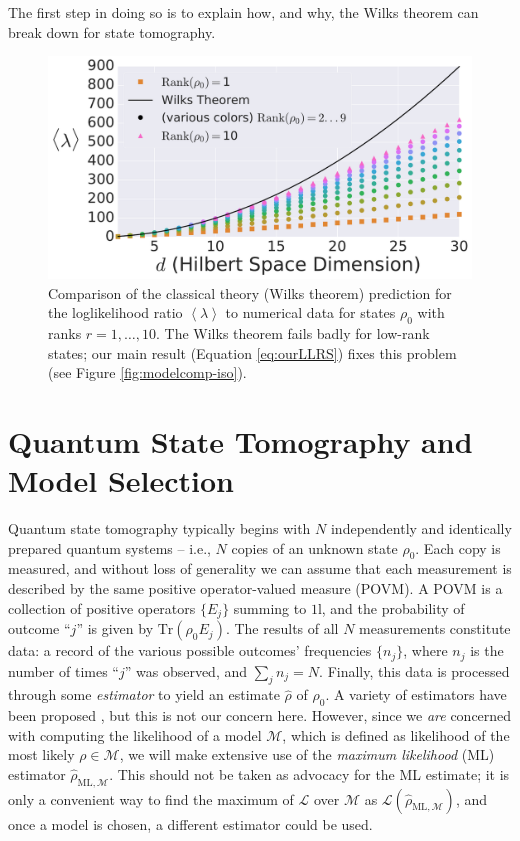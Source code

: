 \documentclass[aps,pra, twocolumn]{revtex4-1}
\newcommand{\M}{\mathcal{M}}
\newcommand{\Tr}{\mathrm{Tr}}
\newcommand{\cL}{\mathcal{L}}
\newcommand{\Id}{\mathbb{I}}
\newcommand{\expect}[1]{\ensuremath{\left\langle#1\right\rangle}}
\def\Id{1\!\mathrm{l}}
\newcommand{\rhohat}{\hat{\rho}}
\newcommand{\rhoML}[1]{\rhohat_{\scriptscriptstyle{\mathrm{ML},#1}}}
\begin{document}
The first step in doing so is to explain how, and why, the Wilks theorem can break down for state tomography.

\begin{figure}[h]
\includegraphics[width=\columnwidth]{Images/Figure_2.pdf}
 \caption{Comparison of the classical theory (Wilks theorem) prediction for the loglikelihood ratio $\expect{\lambda}$ to numerical data for states $\rho_{0}$ with ranks $r=1,\ldots ,10$.  The Wilks theorem fails badly for low-rank states; our main result (Equation \ref{eq:ourLLRS}) fixes this problem (see Figure \ref{fig:modelcomp-iso}).}
\label{fig:boundaries}
\end{figure}

\section{Quantum State Tomography and Model Selection}

Quantum state tomography typically begins with $N$ independently and identically prepared quantum systems -- i.e., $N$ copies of an unknown state $\rho_{0}$.  Each copy is measured, and without loss of generality we can assume that each measurement is described by the same positive operator-valued measure (POVM).  A POVM is a collection of positive operators $\{E_j\}$ summing to $\Id$, and the probability of outcome ``$j$'' is given by $\Tr(\rho_0 E_j)$.  The results of all $N$ measurements constitute data:  a record of the various possible outcomes' frequencies $\{n_{j}\}$, where $n_{j}$ is the number of times ``$j$'' was observed, and $\sum_{j}n_{j} = N$.  Finally, this data is processed through some \emph{estimator} to yield an estimate $\hat{\rho}$ of $\rho_0$.  A variety of estimators have been proposed \cite{Vogel1989,Hradil1997,JamesPRA2001,Blume-Kohout2010b,Blume-Kohout2010,Zhu2014a,Ferrie2016}, but this is not our concern here.  However, since we \emph{are} concerned with computing the likelihood of a model $\M$, which is defined as likelihood of the most likely $\rho\in\M$, we will make extensive use of the \emph{maximum likelihood} (ML) estimator $\rhoML{\M}$.  This should not be taken as advocacy for the ML estimate; it is only a convenient way to find the maximum of $\cL$ over $\M$ as $\mathcal{L}(\rhoML{\M})$, and once a model is chosen, a different estimator could be used.
\end{document}
